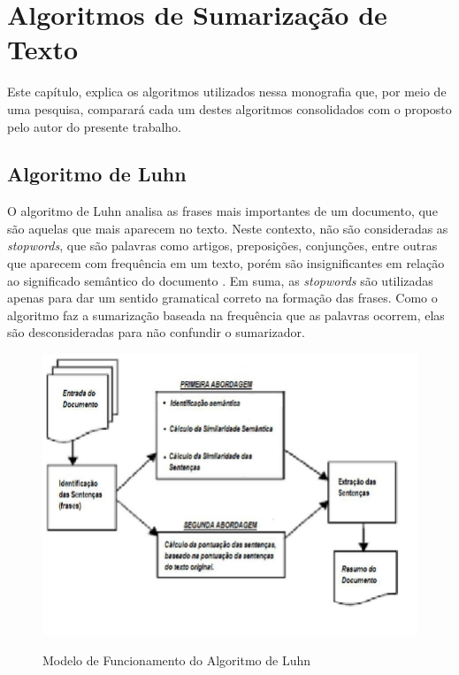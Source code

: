 \chapter{Algoritmos de Sumarização de Texto}
\label{cap:algoritmos}

Este capítulo, explica os algoritmos utilizados nessa monografia que, por meio de uma pesquisa, comparará cada um destes algoritmos consolidados com o proposto pelo autor do presente trabalho.

\section{Algoritmo de Luhn}
\label{chap:Algluhn}
O algoritmo de Luhn analisa as frases mais importantes de um documento, que são aquelas que mais aparecem no 
texto. Neste contexto, não são consideradas as \textit{stopwords}, que são palavras como artigos, preposições, 
conjunções, entre outras que aparecem com frequência em um texto, porém são insignificantes em relação ao 
significado semântico do documento \cite{da2022mineraccao}. Em suma, as \textit{stopwords} são utilizadas apenas 
para dar um sentido gramatical correto na formação das frases. Como o algoritmo faz a sumarização baseada na 
frequência que as palavras ocorrem, elas são desconsideradas para não confundir o sumarizador.

\begin{figure}
    \centering
    \caption{Modelo de Funcionamento do Algoritmo de Luhn}
    \includegraphics[width=.8\textwidth]{figuras/luhn-funcionamento.png}
    \label{fig:luhn-figure}
\end{figure}

